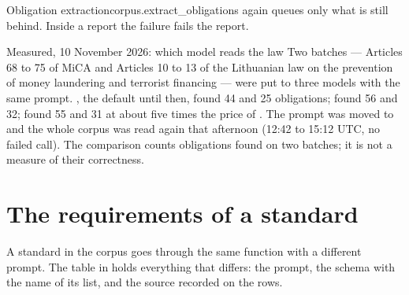 \begin{pathcard}{Obligation extraction}{corpus.extract_obligations}
{    again queues only what is still behind. Inside a report the failure fails the report.}
\end{pathcard}

\begin{lessonbox}{Measured, 10 November 2026: which model reads the law}
Two batches --- Articles 68 to 75 of MiCA and Articles 10 to 13 of the Lithuanian law on the
prevention of money laundering and terrorist financing --- were put to three models with the
same prompt. , the default until then, found 44 and 25 obligations;
 found 56 and 32;  found 55 and 31 at about five times
the price of . The prompt was moved to  and the whole
corpus was read again that afternoon (12:42 to 15:12 UTC, no failed call). The comparison
counts obligations found on two batches; it is not a measure of their correctness.
\end{lessonbox}


\section{The requirements of a standard}\label{sec:obligations:requirements}

A standard in the corpus goes through the same function with a different prompt. The table
 in  holds everything that differs: the prompt, the
schema with the name of its list, and the source recorded on the rows.

